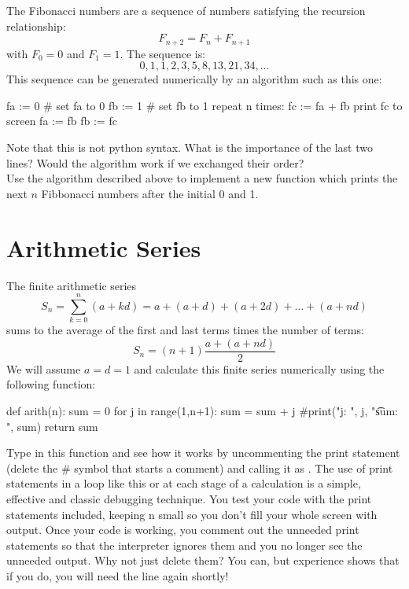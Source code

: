 The Fibonacci numbers are a sequence of numbers satisfying the
recursion relationship:
\begin{displaymath}
F_{n+2} = F_{n} + F_{n+1}
\end{displaymath}
with $F_0=0$ and $F_1=1$.  The sequence is:
\begin{displaymath}
0, 1, 1, 2, 3, 5, 8, 13, 21, 34, \ldots
\end{displaymath}
This sequence can be generated numerically by an algorithm such as this one:
\begin{algorithm}
fa := 0 # set fa to 0
fb := 1 # set fb to 1
repeat n times: 
   fc := fa + fb
   print fc to screen
   fa := fb
   fb := fc
\end{algorithm}
Note that this is not python syntax.  What is the importance of the
last two lines?  Would the algorithm work if we exchanged their order?\\

\plot Use the algorithm described above to implement a new function
 which prints the next $n$ Fibbonacci numbers after the
initial 0 and 1.\\

\section{Arithmetic Series}

The finite arithmetic series
\begin{displaymath}
  S_n = \sum_{k=0}^{n} (a + kd) = a + (a+d) + (a+2d) + \ldots + (a+nd)
\end{displaymath}
sums to the average of the first and last terms times the number of terms:
\begin{equation} \label{eqn:arithsum}
S_n = (n+1)\frac{a + (a+nd)}{2}
\end{equation}
We will assume $a=d=1$ and calculate this finite series numerically using the following function:
\begin{python}
def arith(n):
    sum = 0
    for j in range(1,n+1):
        sum = sum + j
        #print("j: ", j, "\t sum: ", sum)
    return sum    
\end{python}
Type in this function and see how it works by uncommenting the print
statement (delete the \# symbol that starts a comment) and calling it
as .  The use of print statements in a loop like this
or at each stage of a calculation is a simple, effective and classic
debugging technique.  You test your code with the print statements
included, keeping n small so you don't fill your whole screen with
output. Once your code is working, you comment out the unneeded print
statements so that the interpreter ignores them and you no longer
see the unneeded output.  Why not just delete them?  You can, but
experience shows that if you do, you will need the line again shortly!\\

